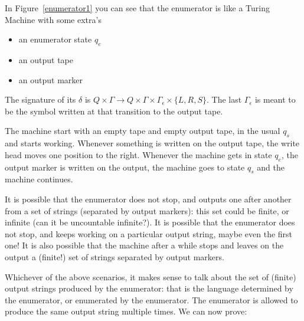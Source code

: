 In Figure~\ref{enumerator1} you can see that the enumerator is like a
Turing Machine with some extra's
\begin{itemize}
\item an enumerator state $q_e$
\item an output tape
\item an output marker
\end{itemize}
The signature of its $\delta$ is
%
$Q \times \Gamma \rightarrow Q \times \Gamma \times \Gamma_\epsilon \times \{L,R,S\}$.
The last $\Gamma_\epsilon$ is meant to be the symbol written at that
transition to the output tape.


The machine start with an empty tape and empty output tape, in the
usual $q_s$ and starts working. Whenever something is written on the
output tape, the write head moves one position to the right. Whenever
the machine gets in state $q_e$, the output marker is written on the
output, the machine goes to state $q_s$ and the machine continues.

It is possible that the enumerator does not stop, and outputs one
after another from a set of strings (separated by output markers):
this set could be finite, or infinite (can it be uncountable
infinite?). It is possible that the enumerator does not stop, and
keeps working on a particular output string, maybe even the first one!
It is also possible that the machine after a while stops and leaves on
the output a (finite!) set of strings separated by output markers.

Whichever of the above scenarios, it makes sense to talk about the set
of (finite) output strings produced by the enumerator: that is the
language determined by the enumerator, or enumerated by the
enumerator. The enumerator is allowed to produce the same output
string multiple times. We can now prove:

